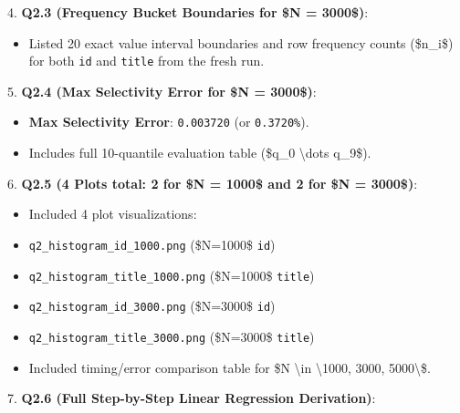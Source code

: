 \documentclass[11pt,a4paper]{article}
\begin{document}
4. \textbf{Q2.3 (Frequency Bucket Boundaries for \$N = 3000\$)}:

\begin{itemize}
\item Listed 20 exact value interval boundaries and row frequency counts (\$n\_i\$) for both \texttt{id} and \texttt{title} from the fresh run.
\end{itemize}

5. \textbf{Q2.4 (Max Selectivity Error for \$N = 3000\$)}:

\begin{itemize}
\item \textbf{Max Selectivity Error}: \texttt{0.003720} (or \texttt{0.3720\%}).
\item Includes full 10-quantile evaluation table (\$q\_0 \textbackslash{}dots q\_9\$).
\end{itemize}

6. \textbf{Q2.5 (4 Plots total: 2 for \$N = 1000\$ and 2 for \$N = 3000\$)}:

\begin{itemize}
\item Included 4 plot visualizations:
\item \texttt{q2\_histogram\_id\_1000.png} (\$N=1000\$ \texttt{id})
\item \texttt{q2\_histogram\_title\_1000.png} (\$N=1000\$ \texttt{title})
\item \texttt{q2\_histogram\_id\_3000.png} (\$N=3000\$ \texttt{id})
\item \texttt{q2\_histogram\_title\_3000.png} (\$N=3000\$ \texttt{title})
\item Included timing/error comparison table for \$N \textbackslash{}in \textbackslash{}{1000, 3000, 5000\textbackslash{}}\$.
\end{itemize}

7. \textbf{Q2.6 (Full Step-by-Step Linear Regression Derivation)}:
\end{document}
